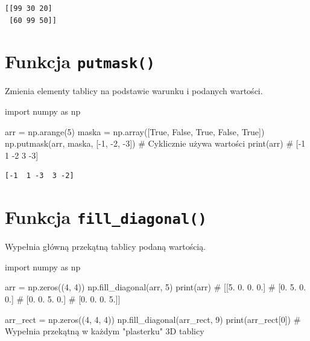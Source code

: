 \documentclass[
  letterpaper,
  DIV=11,
  numbers=noendperiod]{scrreprt}
\newenvironment{Shaded}{\begin{snugshade}}{\end{snugshade}}
\newcommand{\BuiltInTok}[1]{\textcolor[rgb]{0.00,0.23,0.31}{#1}}
\newcommand{\CommentTok}[1]{\textcolor[rgb]{0.37,0.37,0.37}{#1}}
\newcommand{\DecValTok}[1]{\textcolor[rgb]{0.68,0.00,0.00}{#1}}
\newcommand{\ImportTok}[1]{\textcolor[rgb]{0.00,0.46,0.62}{#1}}
\newcommand{\NormalTok}[1]{\textcolor[rgb]{0.00,0.23,0.31}{#1}}
\newcommand{\OperatorTok}[1]{\textcolor[rgb]{0.37,0.37,0.37}{#1}}
\newcommand{\VariableTok}[1]{\textcolor[rgb]{0.07,0.07,0.07}{#1}}
\begin{document}
\begin{verbatim}
[[99 30 20]
 [60 99 50]]
\end{verbatim}

\section{\texorpdfstring{Funkcja
\texttt{putmask()}}{Funkcja putmask()}}\label{funkcja-putmask}

Zmienia elementy tablicy na podstawie warunku i podanych wartości.

\begin{Shaded}
\begin{Highlighting}[]
\ImportTok{import}\NormalTok{ numpy }\ImportTok{as}\NormalTok{ np}

\NormalTok{arr }\OperatorTok{=}\NormalTok{ np.arange(}\DecValTok{5}\NormalTok{)}
\NormalTok{maska }\OperatorTok{=}\NormalTok{ np.array([}\VariableTok{True}\NormalTok{, }\VariableTok{False}\NormalTok{, }\VariableTok{True}\NormalTok{, }\VariableTok{False}\NormalTok{, }\VariableTok{True}\NormalTok{])}
\NormalTok{np.putmask(arr, maska, [}\OperatorTok{{-}}\DecValTok{1}\NormalTok{, }\OperatorTok{{-}}\DecValTok{2}\NormalTok{, }\OperatorTok{{-}}\DecValTok{3}\NormalTok{])  }\CommentTok{\# Cyklicznie używa wartości}
\BuiltInTok{print}\NormalTok{(arr)  }\CommentTok{\# [{-}1  1 {-}2  3 {-}3]}
\end{Highlighting}
\end{Shaded}

\begin{verbatim}
[-1  1 -3  3 -2]
\end{verbatim}

\section{\texorpdfstring{Funkcja
\texttt{fill\_diagonal()}}{Funkcja fill\_diagonal()}}\label{funkcja-fill_diagonal}

Wypełnia główną przekątną tablicy podaną wartością.

\begin{Shaded}
\begin{Highlighting}[]
\ImportTok{import}\NormalTok{ numpy }\ImportTok{as}\NormalTok{ np}

\NormalTok{arr }\OperatorTok{=}\NormalTok{ np.zeros((}\DecValTok{4}\NormalTok{, }\DecValTok{4}\NormalTok{))}
\NormalTok{np.fill\_diagonal(arr, }\DecValTok{5}\NormalTok{)}
\BuiltInTok{print}\NormalTok{(arr)}
\CommentTok{\# [[5. 0. 0. 0.]}
\CommentTok{\#  [0. 5. 0. 0.]}
\CommentTok{\#  [0. 0. 5. 0.]}
\CommentTok{\#  [0. 0. 0. 5.]]}

\NormalTok{arr\_rect }\OperatorTok{=}\NormalTok{ np.zeros((}\DecValTok{4}\NormalTok{, }\DecValTok{4}\NormalTok{, }\DecValTok{4}\NormalTok{))}
\NormalTok{np.fill\_diagonal(arr\_rect, }\DecValTok{9}\NormalTok{)}
\BuiltInTok{print}\NormalTok{(arr\_rect[}\DecValTok{0}\NormalTok{])  }\CommentTok{\# Wypełnia przekątną w każdym "plasterku" 3D tablicy}
\end{Highlighting}
\end{Shaded}
\end{document}
